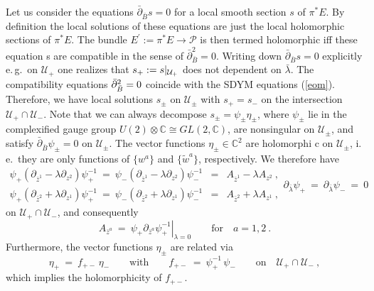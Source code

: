 \documentclass[a4paper,11pt,english]{article}
\numberwithin{equation}{section}
\renewcommand{\=}{\ =\ }
\begin{document}
Let us consider the equations 
$\bar{\partial}_{\bar{{B}}}s=0$ for a local smooth section $s$ of $\pi^*E$. %
 By definition the local solutions of these equations are just the %
 local holomorphic sections of $\pi^*E$. The bundle $E^\prime:=\pi^*E
\rightarrow\mathcal{P}$ is then termed holomorphic iff these equation%
s are compatible in the sense of $\bar{\partial}_{\bar{{B}}}^2=%
0$. Writing down $\bar{\partial}_{\bar{{B}}}s=0$ explicitly e.\,g.\ on %
$\mathcal{U}_+$ one realizes that $s_+:=s|_{\mathcal{U}_%
+}$ does not dependent on $\bar{\lambda}$. The compatibility equations $\bar{%
\partial}_{\bar{{B}}}^2=0$ coincide with the SDYM equations (\ref{eom}). 
Therefore, we have local solutions $s_\pm$ on $%
\mathcal{U}_\pm$ with $s_+=s_-$ on the intersection $\mathcal{U}_+\cap
\mathcal{U}_-$. Note that we can always decompose $s_\pm=\psi_\pm%
\eta_\pm$, where $\psi_\pm$ lie in the complexified gauge group $U(2)
\otimes\mathbb{C}\cong GL(2,\mathbb{C})$, are nonsingular on $\mathcal{U}_\pm%
$, and satisfy $\bar{\partial}_{\bar{{B}}}\psi_\pm=0$ on $\mathcal{U}_\pm$. 
The vector functions $\eta_\pm\in\mathbb{C}^2$ are holomorphi%
c on $\mathcal{U}_\pm$, i.\,e.\ they are only functions of $\{w^a\}$ and $\{%
\tilde{w}^a\}$, respectively. We therefore have
\begin{subequations}\label{cooleq}
\begin{eqnarray}
 \psi_+(\partial_{\bar{z}^1}-\lambda\partial_{z^2})\psi^{-1}_+ \=%
 \psi_-(\partial_{\bar{z}^1}-\lambda\partial_{z^2})\psi^{-1}_- &=&%
 {A}_{\bar{z}^1}-\lambda {A}_{z^2}\ ,\\[8pt]
 \psi_+(\partial_{\bar{z}^2}+\lambda\partial_{z^1})\psi^{-1}_+ \=
 \psi_-(\partial_{\bar{z}^2}+\lambda\partial_{z^1})\psi^{-1}_- &=&%
 {A}_{\bar{z}^2}+\lambda {A}_{z^1}\ ,
\end{eqnarray}
\begin{equation}
 \partial_{\bar{\lambda}}\psi_+\=\partial_{\bar{\lambda}}\psi_- \= 0
\end{equation}%
\end{subequations}
on $\mathcal{U}_+\cap\mathcal{U}_-$, and consequently
\begin{equation}\label{eqfa}
 {A}_{\bar{z}^a}\=\left.\psi_+\partial_{\bar{z}^a}\psi^{-1}_+
 \right|_{\lambda=0}\qquad\text{for}\quad a=1,2\ .
\end{equation}
Furthermore, the vector functions $\eta_\pm$ are related via 
\begin{equation}
 \eta_+\=f_{+-}\,\eta_- \qquad\text{with}\qquad f_{+-}\=\psi^{-1}_+\,\psi_-
 \qquad\text{on}\quad \mathcal{U}_+\cap\mathcal{U}_-\ ,
\end{equation}
which implies the holomorphicity of $f_{+-}$.
\end{document}

